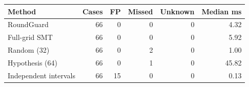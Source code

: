 \begin{tabular}{lrrrrr}
\toprule
Method & Cases & FP & Missed & Unknown & Median ms \\
\midrule
RoundGuard & 66 & 0 & 0 & 0 & 4.32 \\
Full-grid SMT & 66 & 0 & 0 & 0 & 5.92 \\
Random (32) & 66 & 0 & 2 & 0 & 1.00 \\
Hypothesis (64) & 66 & 0 & 1 & 0 & 45.82 \\
Independent intervals & 66 & 15 & 0 & 0 & 0.13 \\
\bottomrule
\end{tabular}